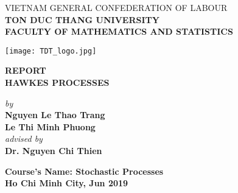 	\thispagestyle{empty}
	\renewcommand{\baselinestretch}{1.2}
	
\begin{center}
	\large{VIETNAM GENERAL CONFEDERATION OF LABOUR} \\
	\large{\textbf{TON DUC THANG UNIVERSITY}} \\
	\large{\textbf{FACULTY OF MATHEMATICS AND STATISTICS}} \\
	\vspace*{1.5cm}
	
	\texttt{[image: TDT\_logo.jpg]} \\
	\vspace*{2cm}
	
	\huge{\textbf{REPORT}} \\ 
	\Huge{\textbf{HAWKES PROCESSES}}\\
	\vspace*{1.5cm}
	
	\LARGE{\textit{by}} \\
	\LARGE{\textbf{Nguyen Le Thao Trang}} \\
	\LARGE{\textbf{Le Thi Minh Phuong}} \\
	\LARGE{\textit{advised by}} \\
	\LARGE{\textbf{Dr. Nguyen Chi Thien}} \\
	\vspace{2cm}
	
	\LARGE{\textbf{Course’s Name: Stochastic Processes}} \\
	
	\large{\textbf{Ho Chi Minh City, Jun 2019}}
	
\end{center}

\newpage
\thispagestyle{empty}
\renewcommand{\baselinestretch}{1.2}

